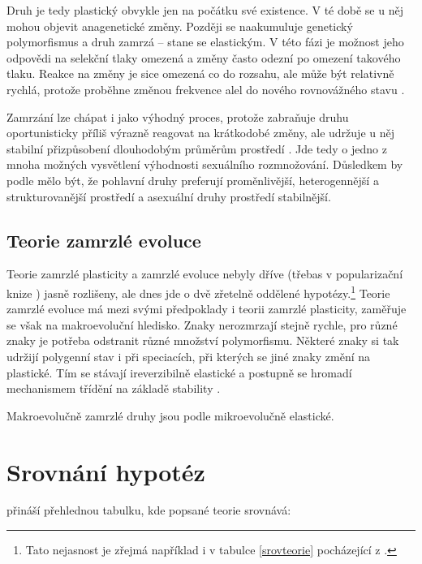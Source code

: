 Druh je tedy plastický obvykle jen na počátku své existence. V té době se u něj mohou objevit anagenetické změny.
Později se naakumuluje genetický polymorfismus a druh zamrzá -- stane se elastickým. V této fázi je možnost jeho
odpovědi na selekční tlaky omezená a změny často odezní po omezení takového tlaku. Reakce na změny je sice omezená
co do rozsahu, ale může být relativně rychlá, protože proběhne změnou frekvence alel do nového rovnovážného stavu
\citep[str. 194]{flegr2016}.

Zamrzání lze chápat i jako výhodný proces, protože zabraňuje druhu oportunisticky příliš výrazně reagovat na
krátkodobé změny, ale udržuje u něj stabilní přizpůsobení dlouhodobým průměrům prostředí \citep[str. 195]{flegr2016}.
Jde tedy o jedno z mnoha možných vysvětlení výhodnosti sexuálního rozmnožování. Důsledkem by podle
\citet[str. 166--167]{toman2015} mělo být, že pohlavní druhy preferují proměnlivější, heterogennější
a strukturovanější prostředí a asexuální druhy prostředí stabilnější.

\subsection{Teorie zamrzlé evoluce}

Teorie zamrzlé plasticity a zamrzlé evoluce nebyly dříve (třebas v popularizační knize \citet{flegr2006})
jasně rozlišeny, ale dnes   jde o dvě zřetelně oddělené hypotézy.\footnote{
Tato nejasnost je zřejmá například i v tabulce \ref{srovteorie} pocházející z \citet{flegr2013}.
}
Teorie zamrzlé evoluce má mezi svými předpoklady i teorii zamrzlé plasticity, zaměřuje se však na makroevoluční
hledisko. Znaky nerozmrzají stejně rychle, pro různé znaky je potřeba odstranit různé množství polymorfismu.
Některé znaky si tak udržijí polygenní stav i při speciacích, při kterých se jiné znaky změní na plastické.
Tím se stávají ireverzibilně elastické a postupně se hromadí mechanismem třídění
na základě stability \citep[str. 294--296]{flegr2016}.

Makroevolučně zamrzlé druhy jsou podle \citet[str. 2]{flegr2013} mikroevolučně elastické.

\section{Srovnání hypotéz}

\citet{flegr2013} přináší přehlednou tabulku, kde popsané teorie srovnává:

\footnotesize

